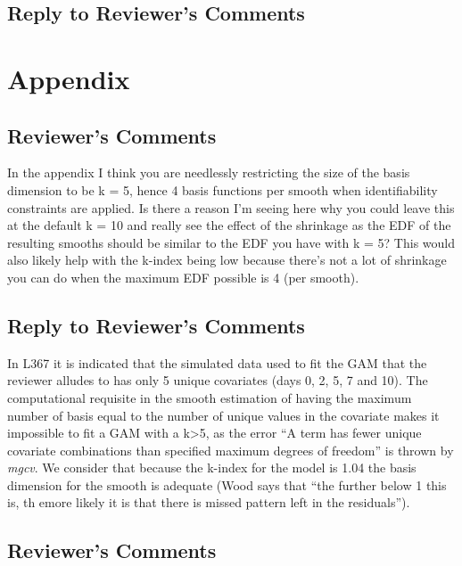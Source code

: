 \documentclass[
]{article}
\begin{document}
\hypertarget{section-9}{%
\subsection{\texorpdfstring{\textcolor{reviewersblue} {Reply to Reviewer's Comments}}{}}\label{section-9}}

\hypertarget{appendix}{%
\section{Appendix}\label{appendix}}

\hypertarget{reviewers-comments-9}{%
\subsection{Reviewer's Comments}\label{reviewers-comments-9}}

In the appendix I think you are needlessly restricting the size of the basis dimension to be k = 5, hence 4 basis functions per smooth when identifiability constraints are applied. Is there a reason I'm seeing here why you could leave this at the default k = 10 and really see the effect of the shrinkage as the EDF of the resulting smooths should be similar to the EDF you have with k = 5? This would also likely help with the k-index being low because there's not a lot of shrinkage you can do when the maximum EDF possible is 4 (per smooth).

\hypertarget{section-10}{%
\subsection{\texorpdfstring{\textcolor{reviewersblue} {Reply to Reviewer's Comments}}{}}\label{section-10}}

In L367 it is indicated that the simulated data used to fit the GAM that the reviewer alludes to has only 5 unique covariates (days 0, 2, 5, 7 and 10). The computational requisite in the smooth estimation of having the maximum number of basis equal to the number of unique values in the covariate makes it impossible to fit a GAM with a k\textgreater5, as the error ``A term has fewer unique covariate combinations than specified maximum degrees of freedom'' is thrown by \emph{mgcv}. We consider that because the k-index for the model is 1.04 the basis dimension for the smooth is adequate (Wood says that ``the further below 1 this is, th emore likely it is that there is missed pattern left in the residuals'').

\hypertarget{reviewers-comments-10}{%
\subsection{Reviewer's Comments}\label{reviewers-comments-10}}
\end{document}
